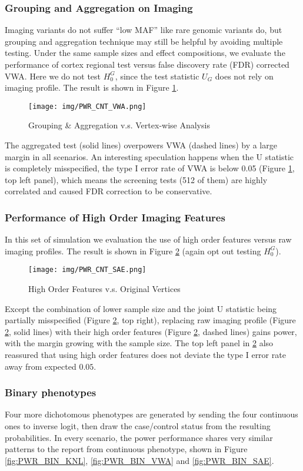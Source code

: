 \subsubsection{Grouping and Aggregation on Imaging}
Imaging variants do not suffer ``low MAF'' like rare genomic variants do, but grouping and aggregation technique may still be helpful by avoiding multiple testing. Under the same sample sizes and effect compositions, we evaluate the performance of cortex regional test versus false discovery rate (FDR) corrected VWA. Here we do not test $H_0^G$, since the test statistic $U_G$ does not rely on imaging profile. The result is shown in Figure \ref{fig:PWR_CNT_VWA}.
\begin{figure}[!htbp]
\centering
\texttt{[image: img/PWR\_CNT\_VWA.png]}
\caption{Grouping \& Aggregation v.s. Vertex-wise Analysis}
\label{fig:PWR_CNT_VWA}
\end{figure}
The aggregated test (solid lines) overpowers VWA (dashed lines) by a large margin in all scenarios. An interesting speculation happens when the U statistic is completely misspecified, the type I error rate of VWA is below 0.05 (Figure \ref{fig:PWR_CNT_VWA}, top left panel), which means the screening tests (512 of them) are highly correlated and caused FDR correction to be conservative. 

\subsubsection{Performance of High Order Imaging Features}
In this set of simulation we evaluation the use of high order features versus raw imaging profiles. The result is shown in Figure \ref{fig:PWR_CNT_SAE} (again opt out testing $H_0^G$).
\begin{figure}[!htbp]
\centering
\texttt{[image: img/PWR\_CNT\_SAE.png]}
\caption{High Order Features v.s. Original Vertices}
\label{fig:PWR_CNT_SAE}
\end{figure}
Except the combination of lower sample size and the joint U statistic being partially misspecified (Figure \ref{fig:PWR_CNT_SAE}, top right), replacing raw imaging profile (Figure \ref{fig:PWR_CNT_SAE}, solid lines) with their high order features (Figure \ref{fig:PWR_CNT_SAE}, dashed lines) gains power, with the margin growing with the sample size. The top left panel in \ref{fig:PWR_CNT_SAE} also reassured that using high order features does not deviate the type I error rate away from expected $0.05$.

\subsubsection{Binary phenotypes}
Four more dichotomous phenotypes are generated by sending the four continuous ones to inverse logit, then draw the case/control status from the resulting probabilities. In every scenario, the power performance shares very similar patterns to the report from continuous phenotype, shown in Figure \ref{fig:PWR_BIN_KNL}, \ref{fig:PWR_BIN_VWA} and \ref{fig:PWR_BIN_SAE}.

